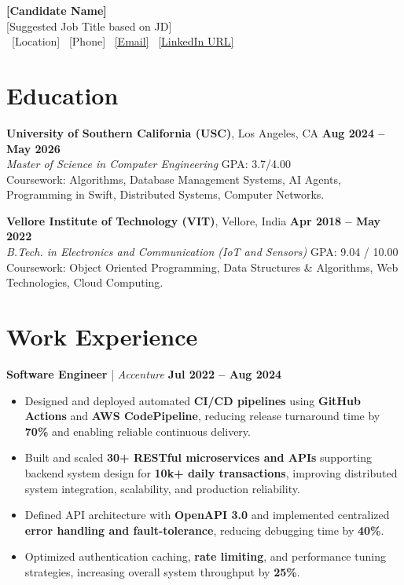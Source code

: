 \documentclass[letterpaper,11pt]{article}
\begin{document}
\begin{center}
    {\LARGE \textbf{[Candidate Name]}}\\
    {\normalsize [Suggested Job Title based on JD]}\\
    \small
    \faMapMarker*\ [Location]
    \quad
    \faPhone*\ [Phone]
    \quad
    \faEnvelope\ \href{mailto:[Email]}{[Email]}
    \quad
    \faLinkedin\ \href{[LinkedIn URL]}{[LinkedIn URL]}
\end{center}
\vspace{-13pt}


\section*{Education}
\textbf{University of Southern California (USC)}, Los Angeles, CA \hfill \textbf{Aug 2024 -- May 2026} \\
\textit{Master of Science in Computer Engineering} \hfill GPA: 3.7/4.00 \\
Coursework: Algorithms, Database Management Systems, AI Agents, Programming in Swift, Distributed Systems, Computer Networks.

\vspace{1pt}

\textbf{Vellore Institute of Technology (VIT)}, Vellore, India \hfill \textbf{Apr 2018 -- May 2022} \\
\textit{B.Tech. in Electronics and Communication (IoT and Sensors)} \hfill GPA: 9.04 / 10.00 \\
Coursework: Object Oriented Programming, Data Structures \& Algorithms, Web Technologies, Cloud Computing.

\section*{Work Experience}

\textbf{Software Engineer} \;|\;\hspace{.1cm} \textit{Accenture} \hfill \textbf{Jul 2022 -- Aug 2024} \\

\begin{itemize}[noitemsep]
    \item Designed and deployed automated \textbf{CI/CD pipelines} using \textbf{GitHub Actions} and \textbf{AWS CodePipeline}, reducing release turnaround time by \textbf{70\%} and enabling reliable continuous delivery.
    \item 
    Built and scaled \textbf{30+ RESTful microservices and APIs} supporting backend system design for \textbf{10k+ daily transactions}, improving distributed system integration, scalability, and production reliability.
    \item Defined API architecture with \textbf{OpenAPI 3.0} and implemented centralized \textbf{error handling and fault-tolerance}, reducing debugging time by \textbf{40\%}.
    \item Optimized authentication caching, \textbf{rate limiting}, and performance tuning strategies, increasing overall system throughput by \textbf{25\%}.
\end{itemize}
\end{document}
